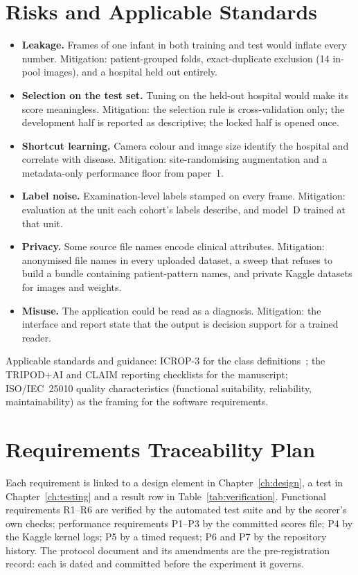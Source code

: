 \section{Risks and Applicable Standards}
\begin{itemize}
\item \textbf{Leakage.} Frames of one infant in both training and test would inflate every number. Mitigation: patient-grouped folds, exact-duplicate exclusion (14 in-pool images), and a hospital held out entirely.
\item \textbf{Selection on the test set.} Tuning on the held-out hospital would make its score meaningless. Mitigation: the selection rule is cross-validation only; the development half is reported as descriptive; the locked half is opened once.
\item \textbf{Shortcut learning.} Camera colour and image size identify the hospital and correlate with disease. Mitigation: site-randomising augmentation and a metadata-only performance floor from paper~1.
\item \textbf{Label noise.} Examination-level labels stamped on every frame. Mitigation: evaluation at the unit each cohort's labels describe, and model~D trained at that unit.
\item \textbf{Privacy.} Some source file names encode clinical attributes. Mitigation: anonymised file names in every uploaded dataset, a sweep that refuses to build a bundle containing patient-pattern names, and private Kaggle datasets for images and weights.
\item \textbf{Misuse.} The application could be read as a diagnosis. Mitigation: the interface and report state that the output is decision support for a trained reader.
\end{itemize}
Applicable standards and guidance: ICROP-3 for the class definitions~\cite{icrop3}; the TRIPOD+AI and CLAIM reporting checklists for the manuscript; ISO/IEC~25010 quality characteristics (functional suitability, reliability, maintainability) as the framing for the software requirements.

\section{Requirements Traceability Plan}
Each requirement is linked to a design element in Chapter~\ref{ch:design}, a test in Chapter~\ref{ch:testing} and a result row in Table~\ref{tab:verification}. Functional requirements R1--R6 are verified by the automated test suite and by the scorer's own checks; performance requirements P1--P3 by the committed scores file; P4 by the Kaggle kernel logs; P5 by a timed request; P6 and P7 by the repository history. The protocol document and its amendments are the pre-registration record: each is dated and committed before the experiment it governs.
